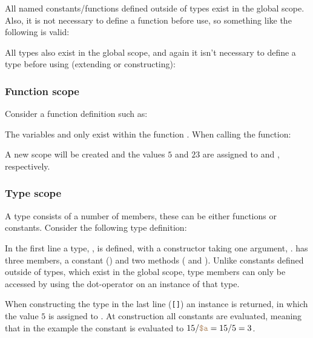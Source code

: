 All named constants/functions defined outside of types exist in the global scope.
Also, it is not necessary to define a function before use, so something
like the following is valid:


All types also exist in the global scope, and again it isn't necessary to define
a type before using (extending or constructing):


\subsubsection{Function scope}
Consider a function definition such as:


The variables  and  only exist within the function .
When calling the function:


A new scope will be created and the values $5$ and $23$
are assigned to  and , respectively.


\subsubsection{Type scope}

A type consists of a number of members, these can be either functions or constants.
Consider the following type definition:


In the first line a type, , is defined, with a constructor taking one
argument, .  has three members, a constant ()
and two methods ( and ). Unlike constants defined
outside of types, which exist in the global scope, type members can only be accessed by
using the dot-operator on an instance of that type.

When constructing the type in the last line (\texttt{[]})
an instance is returned, in which the value $5$ is assigned to .
At construction all constants are evaluated, meaning that in the example
the constant  is evaluated to $15 / \variable{a} = 15 / 5 = 3$.

